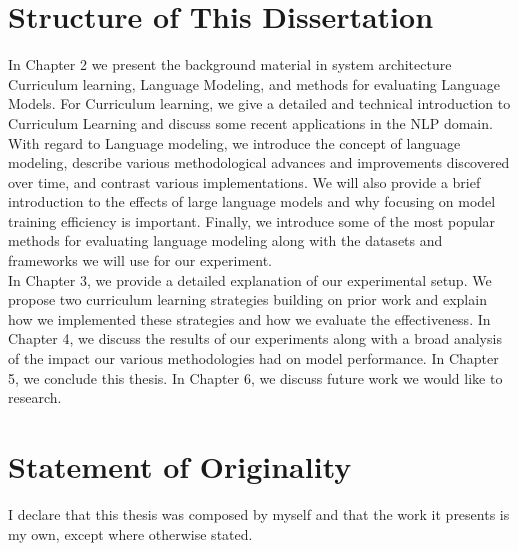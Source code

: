 \section{Structure of This Dissertation}
In Chapter 2 we present the background material in system architecture Curriculum learning, Language Modeling, and methods for evaluating Language Models. For Curriculum learning, we give a detailed and technical introduction to Curriculum Learning and discuss some recent applications in the NLP domain. With regard to Language modeling, we introduce the concept of language modeling, describe various methodological advances and improvements discovered over time, and contrast various implementations. We will also provide a brief introduction to the effects of large language models and why focusing on model training efficiency is important. Finally, we introduce some of the most popular methods for evaluating language modeling along with the datasets and frameworks we will use for our experiment. \\
In Chapter 3, we provide a detailed explanation of our experimental setup. We propose two curriculum learning strategies building on prior work and explain how we implemented these strategies and how we evaluate the effectiveness. 
In Chapter 4, we discuss the results of our experiments along with a broad analysis of the impact our various methodologies had on model performance.
In Chapter 5, we conclude this thesis.
In Chapter 6, we discuss future work we would like to research.
\section{Statement of Originality}
I declare that this thesis was composed by myself and that the work it presents is my own, except where otherwise stated.
